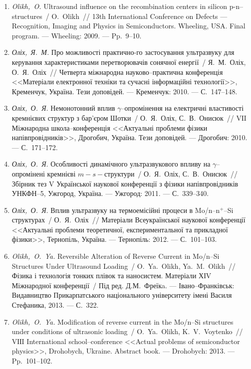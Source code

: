 \begin{enumerate}[label=\arabic*.,leftmargin=1em,itemindent=1em]
  \item
\emph{Olikh,~O.} Ultrasound influence on the recombination centers in
  silicon p-n--structures~/ O.~Olikh~// 13th International Conference on
  Defects --- Recognition, Imaging and Physics in Semiconductors. Wheeling,
  {USA}. Final program. ---
Wheeling: 2009. ---
Pp.~9--10.


\item
\emph{Оліх,~Я.~М.} Про можливості практично-го
  застосування ультразвуку для керування
  характеристиками перетворювачів
  сонячної енергії~/ Я.~М.~Оліх, О.~Я.~Оліх~//
  Четверта міжнародна науково--практична
  конференція <<Матеріали електронної
  техніки та сучасні інформаційні
  технології>>, {К}ременчук, {У}країна. Тези
  доповідей. ---
  {К}ременчук: 2010. ---
  {С.}~147--148.

\item
\emph{Оліх,~О.~Я.} Немонотонний вплив
  $\gamma$--опромінення на електричні
  властивості кремнієвих структур з
  бар’єром {Ш}отки~/ О.~Я.~Оліх, С.~В.~Онисюк~//
  {VІI} {М}іжнародна школа--конференція
  <<Актуальні проблеми фізики
  напівпровідників>>, {Д}рогобич, {У}країна.
  Тези доповідей. ---
  Дрогобич: 2010. ---
  {С.}~171--172.

\item
\emph{Оліх,~О.~Я.} Особливості динамічного
  ультразвукового впливу на
  $\gamma$--опромінені кремнієві $m-s-$структури~/
  О.~Я.~Оліх, С.~В.~Онисюк~// Збірник тез {V}
  {У}країнської наукової конференції з
  фізики напівпровідників {УНКФН}--5,
  Ужгород, {У}країна. ---
  Ужгород: 2011. ---
  {С.}~339--340.

\item
\emph{Оліх,~О.~Я.} Вплив ультразвуку на
  термоемісійні процеси в Mo/n--n$^+$--Si
  структурах~/ О.~Я.~Оліх~// Матеріали
  {В}сеукраїнської наукової конференції
  <<Актуальні проблеми теоретичної,
  експериментальної та прикладної фізики>>,
  {Т}ернопіль, {У}країна. ---
  Тернопіль: 2012. ---
  {С.}~101--103.

\item
\emph{Olikh,~O.~Ya.} Reversible Alteration of Reverse Current in Mo/n--Si
  Structures Under Ultrasound Loading~/ O.~Ya.~Olikh, Ya.~M.~Olikh~//
  Фізика і технологія тонких плівок та
  наносистем. {М}атеріали {ХІV} Міжнародної
  конференції~/ {Під ред. }Д.М.~Фреїкa. ---
  Івано--Франківськ: Видавництво
  {П}рикарпатського національного
  університету імені {В}асиля {С}тефаника,
  2013. ---
  {С.}~322.

\item
\emph{Olikh,~O.~Ya.} Modification of reverse current in the Mo/n--Si
  structures under conditions of ultrasonic loading~/ O.~Ya.~Olikh,
  K.~V.~Voytenko~// {VІІI} {I}nternational school--conference <<Actual
  problems of semiconductor physics>>, {D}rohobych, {U}kraine. Abstract book.
  ---
  Drohobych: 2013. ---
  Pp.~101--102.


\end{enumerate}
